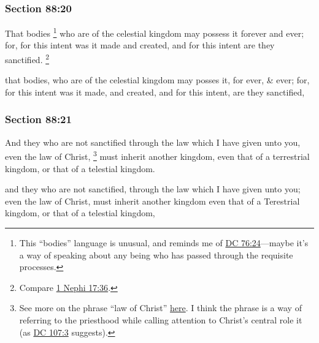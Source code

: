 	\subsubsection{Section 88:20} %
		\label{DC88-20}

		That bodies%
			\footnote{%
				This ``bodies'' language is unusual, and reminds me of \hyperref[DC76-24]{DC 76:24}---maybe it's a way of speaking about any being who has passed through the requisite processes.
				}
		who are of the celestial kingdom may possess it forever and ever; for, for this intent was it made and created, and for this intent are they sanctified.%
			\footnote{%
				Compare \hyperref[1NEPHI-17-36]{1 Nephi 17:36}.
				}

		\begin{framed}
		\scriptsize
			\begin{compactdesc}
				\item[JSP] that bodies, who are of the celestial kingdom may posses it, for ever, \& ever; for, for this intent was it made, and created, and for this intent, are they sanctified,
			\end{compactdesc}
		\end{framed}

	\subsubsection{Section 88:21} %
		\label{DC88-21}

		And they who are not sanctified through the law which I have given unto you, even the law of Christ,%
			\footnote{%
				See more on the phrase ``law of Christ'' \hyperref[LAW-PHRASES]{here}. I think the phrase is a way of referring to the priesthood while calling attention to Christ's central role it (as \hyperref[DC107-3]{DC 107:3} suggests).
				}
		must inherit another kingdom, even that of a terrestrial kingdom, or that of a telestial kingdom.

		\begin{framed}
		\scriptsize
			\begin{compactdesc}
				\item[JSP] and they who are not sanctified, through the law which I have given unto you; even the law of Christ, must inherit another kingdom even that of a Terestrial kingdom, or that of a telestial kingdom,
			\end{compactdesc}
		\end{framed}

